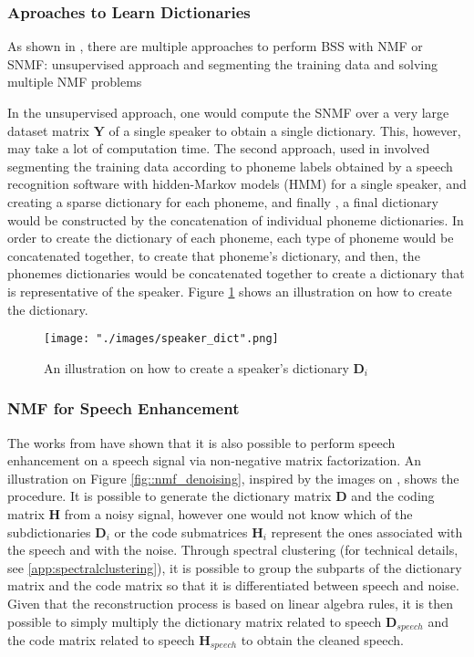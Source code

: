 \subsubsection{Aproaches to Learn Dictionaries}
As shown in \cite{singlechannel}, there are multiple approaches to perform BSS with NMF or SNMF: unsupervised approach and segmenting the training data and solving multiple NMF problems

In the unsupervised approach, one would compute the SNMF over a very large dataset matrix $\bm{Y}$ of a single speaker to obtain a single dictionary. This, however, may take a lot of computation time. The second approach, used in \cite{singlechannel} involved segmenting the training data according to phoneme labels obtained by a speech recognition software with hidden-Markov models (HMM) for a single speaker, and creating a sparse dictionary for each phoneme, and finally , a final dictionary would be constructed by the concatenation of individual phoneme dictionaries. In order to create the dictionary of each phoneme, each type of phoneme would be concatenated together, to create that phoneme's dictionary, and then, the phonemes dictionaries would be concatenated together to create a dictionary that is representative of the speaker. Figure \ref{fig::speaker_dict} shows an illustration on how to create the dictionary.

\begin{figure}[H]
\begin{center}
    \texttt{[image: "./images/speaker\_dict".png]}
    \caption{An illustration on how to create a speaker's dictionary $\bm{D}_i$}
    \label{fig::speaker_dict}
\end{center}
\end{figure}

\subsubsection{NMF for Speech Enhancement}
The works from \cite{nmf_denoising} have shown that it is also possible to perform speech enhancement on a speech signal via non-negative matrix factorization. An illustration on Figure \ref{fig::nmf_denoising}, inspired by the images on \cite{nmf_denoising}, shows the procedure. It is possible to generate the dictionary matrix $\bm{D}$ and the coding matrix $\bm{H}$ from a noisy signal, however one would not know which of the subdictionaries $\bm{D}_i$ or the code submatrices $\bm{H}_i$ represent the ones associated with the speech and with the noise. Through spectral clustering (for technical details, see \ref{app:spectralclustering}), it is possible to group the subparts of the dictionary matrix and the code matrix so that it is differentiated between speech and noise. Given that the reconstruction process is based on linear algebra rules, it is then possible to simply multiply the dictionary matrix related to speech $\bm{D}_{speech}$ and the code matrix related to speech $\bm{H}_{speech}$ to obtain the cleaned speech.

